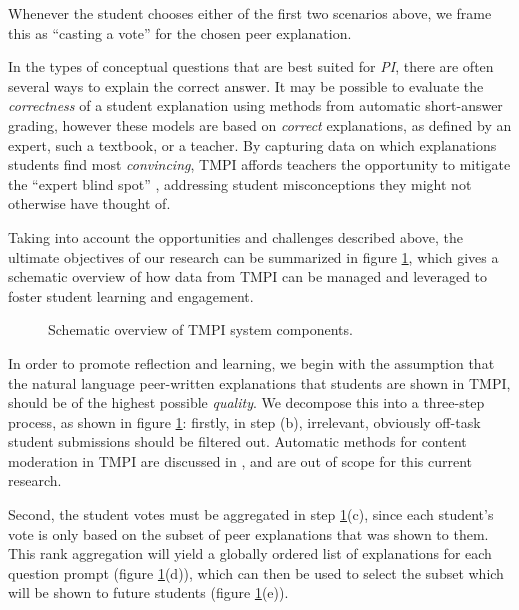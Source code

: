 \documentclass[notitlepage,12pt]{jedm}
\begin{document}
Whenever the student chooses either of the first two scenarios above, we 
frame this as ``casting a vote'' for the chosen peer explanation.

In the types of conceptual questions that are best suited for \textit{PI}, 
there are often several ways to explain the correct answer.
It may be possible to evaluate the \textit{correctness} of a student 
explanation using methods from automatic short-answer grading, however 
these models are based on \textit{correct} explanations, as defined by an 
expert, such a textbook, or a teacher.
By capturing data on which explanations students find most \textit{convincing}, 
TMPI affords teachers the opportunity to mitigate the ``expert blind spot'' 
\cite{nathan_expert_2001}, addressing student misconceptions they might not 
otherwise have thought of.

Taking into account the opportunities and challenges described above, the 
ultimate objectives of our research can be summarized in figure 
\ref{fig:tmpi_research}, which gives a schematic overview of how data from TMPI 
can be managed and leveraged to foster student learning and engagement.
 
\begin{figure}[H]
	\centering
	\def\svgscale{0.70}
	
	\caption{
		Schematic overview of TMPI system components.
		 }
	\label{fig:tmpi_research}
\end{figure}

In order to promote reflection and learning, we begin with the assumption that 
the natural language peer-written explanations that students are shown in TMPI, 
should be of the highest possible \textit{quality}.
We decompose this into a three-step process, as shown in figure 
\ref{fig:tmpi_research}: firstly, in step (b), irrelevant, obviously off-task 
student submissions should be filtered out. 
Automatic methods for content moderation in TMPI are discussed in 
\cite{gagnon_filtering_2019}, and are out of scope for this current research.

Second, the student votes must be aggregated in step 
\ref{fig:tmpi_research}(c), since each student's vote is only based on the 
subset of peer explanations that was shown to them.
This rank aggregation will yield a globally ordered list of explanations for 
each question prompt (figure \ref{fig:tmpi_research}(d)), which can then be 
used to select the subset which will be shown to future students (figure 
\ref{fig:tmpi_research}(e)).
\end{document}
